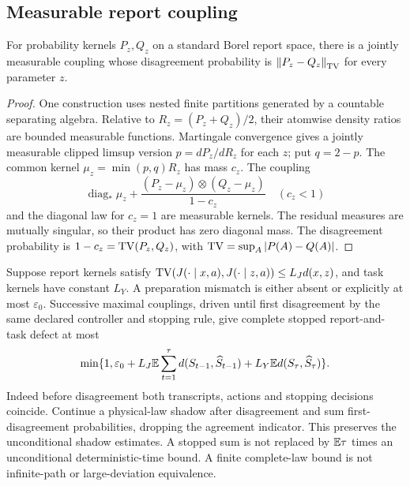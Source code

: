 \subsection{Measurable report coupling}
\begin{lemma}\label{lem:coupling}
For probability kernels $P_z,Q_z$ on a standard Borel report space, there is a jointly measurable coupling whose disagreement probability is $\left\lVert P_z-Q_z\right\rVert_{\operatorname{TV}}$ for every parameter $z$.
\end{lemma}
\begin{proof}
One construction uses nested finite partitions generated by a countable separating algebra. Relative to $R_z=(P_z+Q_z)/2$, their atomwise density ratios are bounded measurable functions. Martingale convergence gives a jointly measurable clipped limsup version $p=dP_z/dR_z$ for each $z$; put $q=2-p$. The common kernel $\mu_z=\min(p,q)R_z$ has mass $c_z$. The coupling
\[
 \operatorname{diag}_*\mu_z+
 \frac{(P_z-\mu_z)\otimes(Q_z-\mu_z)}{1-c_z}\quad(c_z<1)
\]
and the diagonal law for $c_z=1$ are measurable kernels. The residual measures are mutually singular, so their product has zero diagonal mass. The disagreement probability is $1-c_z=\operatorname{TV}(P_z,Q_z)$, with $\operatorname{TV}=\sup_A|P(A)-Q(A)|$.
\end{proof}

Suppose report kernels satisfy $\operatorname{TV}(J(\cdot\mid x,a),J(\cdot\mid z,a))\le L_Jd(x,z)$, and task kernels have constant $L_Y$. A preparation mismatch is either absent or explicitly at most $\varepsilon_0$. Successive maximal couplings, driven until first disagreement by the same declared controller and stopping rule, give complete stopped report-and-task defect at most
\begin{equation}\label{eq:reporttv}
 \min\{1,\varepsilon_0+L_J\mathbb E\sum_{t=1}^\tau d(S_{t-1},\widehat S_{t-1})
                         +L_Y\mathbb E d(S_\tau,\widehat S_\tau)\}.
\end{equation}
Indeed before disagreement both transcripts, actions and stopping decisions coincide. Continue a physical-law shadow after disagreement and sum first-disagreement probabilities, dropping the agreement indicator. This preserves the unconditional shadow estimates. A stopped sum is not replaced by $\mathbb E\tau$ times an unconditional deterministic-time bound. A finite complete-law bound is not infinite-path or large-deviation equivalence.

